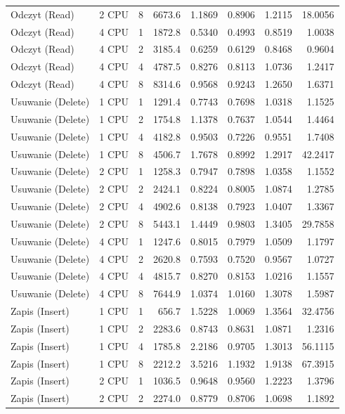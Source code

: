 \begin{table}[ht]
{\begin{tabular}{llcrrrrr}
Odczyt (Read) & 2 CPU & 8 & 6673.6 & 1.1869 & 0.8906 & 1.2115 & 18.0056 \\
Odczyt (Read) & 4 CPU & 1 & 1872.8 & 0.5340 & 0.4993 & 0.8519 & 1.0038 \\
Odczyt (Read) & 4 CPU & 2 & 3185.4 & 0.6259 & 0.6129 & 0.8468 & 0.9604 \\
Odczyt (Read) & 4 CPU & 4 & 4787.5 & 0.8276 & 0.8113 & 1.0736 & 1.2417 \\
Odczyt (Read) & 4 CPU & 8 & 8314.6 & 0.9568 & 0.9243 & 1.2650 & 1.6371 \\
Usuwanie (Delete) & 1 CPU & 1 & 1291.4 & 0.7743 & 0.7698 & 1.0318 & 1.1525 \\
Usuwanie (Delete) & 1 CPU & 2 & 1754.8 & 1.1378 & 0.7637 & 1.0544 & 1.4464 \\
Usuwanie (Delete) & 1 CPU & 4 & 4182.8 & 0.9503 & 0.7226 & 0.9551 & 1.7408 \\
Usuwanie (Delete) & 1 CPU & 8 & 4506.7 & 1.7678 & 0.8992 & 1.2917 & 42.2417 \\
Usuwanie (Delete) & 2 CPU & 1 & 1258.3 & 0.7947 & 0.7898 & 1.0358 & 1.1552 \\
Usuwanie (Delete) & 2 CPU & 2 & 2424.1 & 0.8224 & 0.8005 & 1.0874 & 1.2785 \\
Usuwanie (Delete) & 2 CPU & 4 & 4902.6 & 0.8138 & 0.7923 & 1.0407 & 1.3367 \\
Usuwanie (Delete) & 2 CPU & 8 & 5443.1 & 1.4449 & 0.9803 & 1.3405 & 29.7858 \\
Usuwanie (Delete) & 4 CPU & 1 & 1247.6 & 0.8015 & 0.7979 & 1.0509 & 1.1797 \\
Usuwanie (Delete) & 4 CPU & 2 & 2620.8 & 0.7593 & 0.7520 & 0.9567 & 1.0727 \\
Usuwanie (Delete) & 4 CPU & 4 & 4815.7 & 0.8270 & 0.8153 & 1.0216 & 1.1557 \\
Usuwanie (Delete) & 4 CPU & 8 & 7644.9 & 1.0374 & 1.0160 & 1.3078 & 1.5987 \\
Zapis (Insert) & 1 CPU & 1 & 656.7 & 1.5228 & 1.0069 & 1.3564 & 32.4756 \\
Zapis (Insert) & 1 CPU & 2 & 2283.6 & 0.8743 & 0.8631 & 1.0871 & 1.2316 \\
Zapis (Insert) & 1 CPU & 4 & 1785.8 & 2.2186 & 0.9705 & 1.3013 & 56.1115 \\
Zapis (Insert) & 1 CPU & 8 & 2212.2 & 3.5216 & 1.1932 & 1.9138 & 67.3915 \\
Zapis (Insert) & 2 CPU & 1 & 1036.5 & 0.9648 & 0.9560 & 1.2223 & 1.3796 \\
Zapis (Insert) & 2 CPU & 2 & 2274.0 & 0.8779 & 0.8706 & 1.0698 & 1.1892 \\

\end{tabular}}
\end{table}
